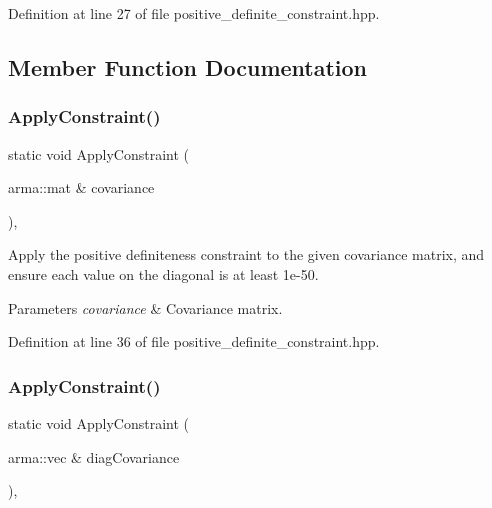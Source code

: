 Definition at line 27 of file positive\+\_\+definite\+\_\+constraint.\+hpp.



\subsection{Member Function Documentation}
\mbox{\label{classmlpack_1_1gmm_1_1PositiveDefiniteConstraint_a1e68c9489180b84b3a8d1e265a3d8a8f}} 
\subsubsection{Apply\+Constraint()\hspace{0.1cm}{\footnotesize\ttfamily [1/2]}}
{\footnotesize\ttfamily static void Apply\+Constraint (\begin{DoxyParamCaption}\item[{arma\+::mat \&}]{covariance }\end{DoxyParamCaption})\hspace{0.3cm}{\ttfamily [inline]}, {\ttfamily [static]}}



Apply the positive definiteness constraint to the given covariance matrix, and ensure each value on the diagonal is at least 1e-\/50. 


\begin{DoxyParams}{Parameters}
{\em covariance} & Covariance matrix. \\
\hline
\end{DoxyParams}


Definition at line 36 of file positive\+\_\+definite\+\_\+constraint.\+hpp.

\mbox{\label{classmlpack_1_1gmm_1_1PositiveDefiniteConstraint_a5262e4a927a389167cfc7714de4df883}} 
\subsubsection{Apply\+Constraint()\hspace{0.1cm}{\footnotesize\ttfamily [2/2]}}
{\footnotesize\ttfamily static void Apply\+Constraint (\begin{DoxyParamCaption}\item[{arma\+::vec \&}]{diag\+Covariance }\end{DoxyParamCaption})\hspace{0.3cm}{\ttfamily [inline]}, {\ttfamily [static]}}



